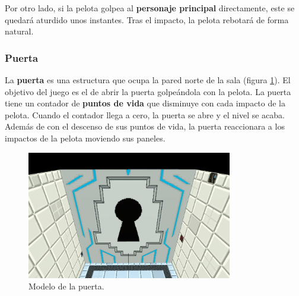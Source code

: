 Por otro lado, si la pelota golpea al \textbf{personaje principal} directamente, este se quedará aturdido unos instantes. Tras el impacto, la pelota rebotará de forma natural.

\subsubsection{Puerta}
La \textbf{puerta} es una estructura que ocupa la pared norte de la sala (figura \ref{puerta}). El objetivo del juego es el de abrir la puerta golpeándola con la pelota. La puerta tiene un contador de \textbf{puntos de vida} que disminuye con cada impacto de la pelota. Cuando el contador llega a cero, la puerta se abre y el nivel se acaba. Además de con el descenso de sus puntos de vida, la puerta reaccionara a los impactos de la pelota moviendo sus paneles.
\begin{figure}[h]
	\includegraphics[width=0.8\textwidth]{images/estructura/fisica/puerta}
	\centering
	\caption{Modelo de la puerta.}
	\label{puerta}
\end{figure}

